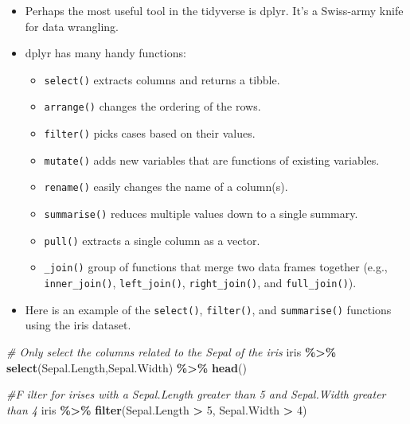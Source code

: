 \documentclass[
]{book}
\newenvironment{Shaded}{\begin{snugshade}}{\end{snugshade}}
\newcommand{\CommentTok}[1]{\textcolor[rgb]{0.56,0.35,0.01}{\textit{#1}}}
\newcommand{\DecValTok}[1]{\textcolor[rgb]{0.00,0.00,0.81}{#1}}
\newcommand{\FunctionTok}[1]{\textcolor[rgb]{0.13,0.29,0.53}{\textbf{#1}}}
\newcommand{\NormalTok}[1]{#1}
\newcommand{\SpecialCharTok}[1]{\textcolor[rgb]{0.81,0.36,0.00}{\textbf{#1}}}
\providecommand{\tightlist}{%
  \setlength{\itemsep}{0pt}\setlength{\parskip}{0pt}}
\begin{document}
\begin{itemize}
\item
  Perhaps the most useful tool in the tidyverse is dplyr. It's a Swiss-army knife for data wrangling.
\item
  dplyr has many handy functions:

  \begin{itemize}
  \tightlist
  \item
    \texttt{select()} extracts columns and returns a tibble.
  \item
    \texttt{arrange()} changes the ordering of the rows.
  \item
    \texttt{filter()} picks cases based on their values.
  \item
    \texttt{mutate()} adds new variables that are functions of existing variables.
  \item
    \texttt{rename()} easily changes the name of a column(s).
  \item
    \texttt{summarise()} reduces multiple values down to a single summary.
  \item
    \texttt{pull()} extracts a single column as a vector.
  \item
    \texttt{\_join()} group of functions that merge two data frames together (e.g., \texttt{inner\_join()}, \texttt{left\_join()}, \texttt{right\_join()}, and \texttt{full\_join()}).
  \end{itemize}
\item
  Here is an example of the \texttt{select()}, \texttt{filter()}, and \texttt{summarise()} functions using the iris dataset.
\end{itemize}

\begin{Shaded}
\begin{Highlighting}[]
\CommentTok{\# Only select the columns related to the Sepal of the iris}
\NormalTok{iris }\SpecialCharTok{\%\textgreater{}\%}
  \FunctionTok{select}\NormalTok{(Sepal.Length,Sepal.Width) }\SpecialCharTok{\%\textgreater{}\%}
  \FunctionTok{head}\NormalTok{()}
\end{Highlighting}
\end{Shaded}

\begin{Shaded}
\begin{Highlighting}[]
\CommentTok{\#F ilter for irises with a Sepal.Length greater than 5 and Sepal.Width greater than 4}
\NormalTok{iris }\SpecialCharTok{\%\textgreater{}\%}
  \FunctionTok{filter}\NormalTok{(Sepal.Length }\SpecialCharTok{\textgreater{}} \DecValTok{5}\NormalTok{, Sepal.Width }\SpecialCharTok{\textgreater{}} \DecValTok{4}\NormalTok{)}
\end{Highlighting}
\end{Shaded}
\end{document}
